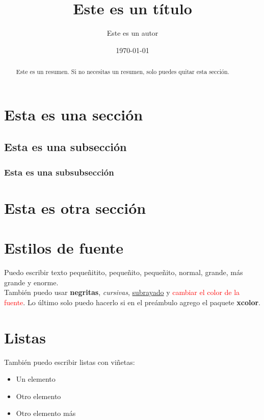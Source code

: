 \documentclass[]{article}
\title{Este es un título}
\author{Este es un autor}
\date{\today} %
\begin{document}
\maketitle

\begin{abstract}
 Este es un resumen. Si no necesitas un resumen, solo puedes quitar esta sección.
\end{abstract}

\section{Esta es una sección}
\lipsum[1]

\subsection{Esta es una subsección}
\lipsum[2]

\subsubsection{Esta es una subsubsección}
\lipsum[3]

\section{Esta es otra sección}
\lipsum[4]

\section{Estilos de fuente}

Puedo escribir texto {\tiny pequeñitito}, {\footnotesize pequeñito}, {\small pequeñito}, normal, {\large grande}, {\Large más grande} y {\Huge enorme}.\\

También puedo usar \textbf{negritas}, \textit{cursivas}, \underline{subrayado} y \textcolor{red}{cambiar el color de la fuente}. Lo último solo puedo hacerlo si en el preámbulo agrego el paquete \textbf{xcolor}.

\section{Listas}
También puedo escribir listas con viñetas:
\begin{itemize}
	\item Un elemento
	\item Otro elemento
	\item Otro elemento más
\end{itemize}
\end{document}
